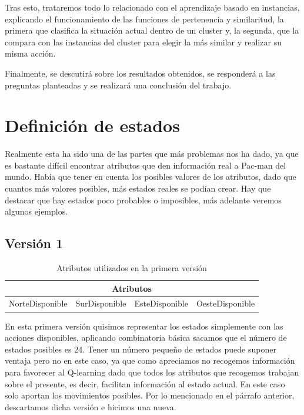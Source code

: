 \documentclass[11pt,a4paper]{article}
\begin{document}
Tras esto, trataremos todo lo relacionado con el aprendizaje basado en instancias, explicando el funcionamiento de las funciones de pertenencia y similaritud, la primera que clasifica la situación actual dentro de un cluster y, la segunda, que la compara con las instancias del cluster para elegir la más similar y realizar su misma acción.

Finalmente, se descutirá sobre los resultados obtenidos, se responderá a las preguntas planteadas y se realizará una conclusión del trabajo.

\section{Definición de estados}

Realmente esta ha sido una de las partes que más problemas nos ha dado, ya que es bastante difícil encontrar atributos que den información real a Pac-man del mundo. Había que tener en cuenta los posibles valores de los atributos, dado que cuantos más valores posibles, más estados reales se podían crear.
Hay que destacar que hay estados poco probables o imposibles, más adelante veremos algunos ejemplos.

\subsection{Versión 1}

\begin{table}[H]
\centering
\label{atributosV1}
\begin{tabular}{|l|l|l|l|}
\hline
\multicolumn{4}{|c|}{\textbf{Atributos}}                           \\ \hline
NorteDisponible & SurDisponible & EsteDisponible & OesteDisponible \\ \hline
\end{tabular}
\caption{Atributos utilizados en la primera versión}
\end{table}

En esta primera versión quisimos representar los estados simplemente con las acciones disponibles, aplicando combinatoria básica sacamos que el número de estados posibles es 24. Tener un número pequeño de estados puede suponer ventaja pero no en este caso, ya que como apreciamos no recogemos información para favorecer al Q-learning dado que todos los atributos que recogemos trabajan sobre el presente, es decir, facilitan información al estado actual. En este caso solo aportan los movimientos posibles. 
Por lo mencionado en el párrafo anterior, descartamos dicha versión e hicimos una nueva.
\end{document}
